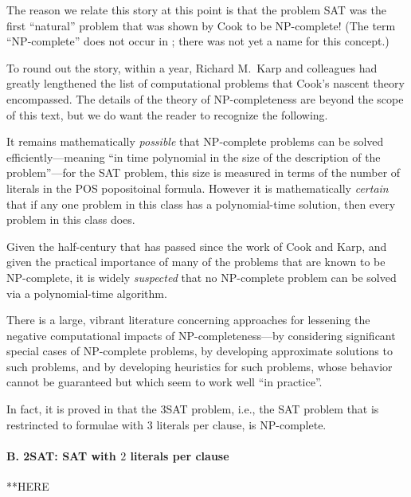 The reason we relate this story at this point is that the problem {\sf
  SAT} was the first ``natural'' problem that was shown by Cook to be
{\sf NP}-complete!  (The term ``{\sf NP}-complete'' does not occur in
\cite{Cook71}; there was not yet a name for this concept.)

\noindent
To round out the story, within a year, Richard M.~Karp 
and colleagues had greatly lengthened the list of computational
problems that Cook's nascent theory encompassed.  The details
of the theory of {\sf NP}-completeness are beyond the scope of this
text, but we do want the reader to recognize the following.

It remains mathematically {\em possible} that {\sf NP}-complete
problems can be solved efficiently---meaning ``in time polynomial in
the size of the description of the problem''---for the {\sf SAT}
problem, this size is measured in terms of the number of literals in
the POS popositoinal formula.  However it is mathematically {\em
  certain} that if any one problem in this class has a polynomial-time
solution, then every problem in this class does.

Given the half-century that has passed since the work of Cook and
Karp, and given the practical importance of many of the problems that
are known to be {\sf NP}-complete, it is widely {\em suspected} that
no {\sf NP}-complete problem can be solved via a polynomial-time
algorithm.

There is a large, vibrant literature concerning approaches for
lessening the negative computational impacts of {\sf
  NP}-completeness---by considering significant special cases of {\sf
  NP}-complete problems, by developing approximate solutions to such
problems, and by developing heuristics for such problems, whose
behavior cannot be guaranteed but which seem to work well ``in
practice''.

\medskip

In fact, it is proved in \cite{Cook71} that the {\sf 3SAT} problem,
i.e., the  {\sf SAT} problem that is restrincted to formulae with $3$
literals per clause, is {\sf NP}-complete.

\medskip

\paragraph{\small\sf B. 2SAT: SAT with $2$ literals per clause}

**HERE



